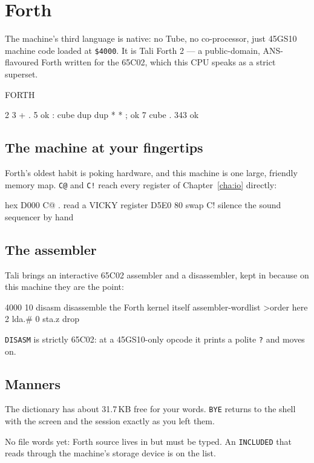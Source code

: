 \chapter{Forth}\label{cha:forth}

The machine's third language is native: no Tube, no co-processor, just
45GS10 machine code loaded at \texttt{\$4000}. It is Tali Forth 2 ---
a public-domain, ANS-flavoured Forth written for the 65C02, which this
CPU speaks as a strict superset.

\begin{type}
FORTH
\end{type}

\begin{type}
2 3 + . 5  ok
: cube dup dup * * ;  ok
7 cube . 343  ok
\end{type}


\section{The machine at your fingertips}
Forth's oldest habit is poking hardware, and this machine is one large,
friendly memory map. \verb|C@| and \verb|C!| reach every register of
Chapter~\ref{cha:io} directly:

\begin{type}
hex
D000 C@ .            read a VICKY register
D5E0 80 swap C!      silence the sound sequencer by hand
\end{type}

\section{The assembler}
Tali brings an interactive 65C02 assembler and a disassembler, kept in
because on this machine they are the point:

\begin{type}
4000 10 disasm       disassemble the Forth kernel itself
assembler-wordlist >order
here  2 lda.#  0 sta.z  drop
\end{type}

\verb|DISASM| is strictly 65C02: at a 45GS10-only opcode it prints a polite
\verb|?| and moves on.

\section{Manners}
The dictionary has about 31.7\,KB free for your words. \verb|BYE| returns
to the shell with the screen and the session exactly as you left them.

\begin{aside}
No file words yet: Forth source lives in  but must be
typed.
An \texttt{INCLUDED} that reads through the machine's storage device is on
the list.
\end{aside}
